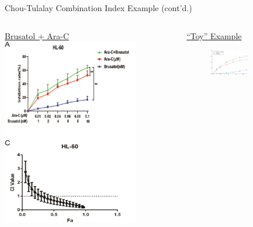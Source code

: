 \documentclass{beamer}
\begin{document}
\begin{frame}[t]{Chou-Tulalay Combination Index Example (cont'd.)}
    \begin{columns}
        \begin{column}{0.5\textwidth}
            \centering
            \large \underline{Brusatol + Ara-C}
            \includegraphics[width=0.9\textwidth, height = 0.7\textheight]{figs/brusatol-synergy-example.png}
        \end{column}
        \begin{column}{0.5\textwidth}
            \begin{figure}
                \centering
                \large \underline{``Toy'' Example}
                \begin{subfigure}{0.9\textwidth}
                    \centering
                    \includegraphics[width=0.9\textwidth, height = 0.35\textheight]{figs/my-brusatol.png}

\end{subfigure}
\end{figure}
\end{column}
\end{columns}
\end{frame}
\end{document}
